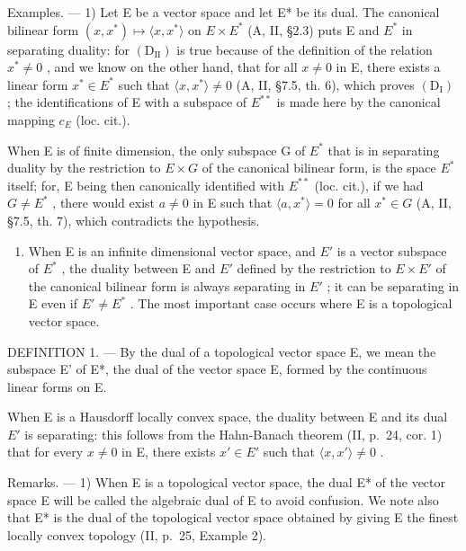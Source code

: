 Examples. --- 1) Let E be a vector space and let E* be its dual. The canonical bilinear form \((x, x^{*}) \mapsto \langle x, x^{*} \rangle\) on \(E \times E^{*}\) (A, II, §2.3) puts E and \(E^{*}\) in separating duality: for \((\mathrm{D}_{\mathrm{II}})\) is true because of the definition of the relation \(x^{*} \neq 0\) , and we know on the other hand, that for all \(x \neq 0\) in E, there exists a linear form \(x^{*} \in E^{*}\) such that \(\langle x, x^{*} \rangle \neq 0\) (A, II, §7.5, th. 6), which proves \((\mathrm{D}_{\mathrm{I}})\) ; the identifications of E with a subspace of \(E^{**}\) is made here by the canonical mapping \(c_{E}\) (loc. cit.).

When E is of finite dimension, the only subspace G of \(E^{*}\) that is in separating duality by the restriction to \(E \times G\) of the canonical bilinear form, is the space \(E^{*}\) itself; for, E being then canonically identified with \(E^{**}\) (loc. cit.), if we had \(G \neq E^{*}\) , there would exist \(a \neq 0\) in E such that \(\langle a, x^{*} \rangle = 0\) for all \(x^{*} \in G\) (A, II, §7.5, th. 7), which contradicts the hypothesis.

\begin{enumerate}
\def\labelenumi{\arabic{enumi})}
\setcounter{enumi}{1}
\tightlist
\item
  When E is an infinite dimensional vector space, and \(E'\) is a vector subspace of \(E^{*}\) , the duality between E and \(E'\) defined by the restriction to \(E \times E'\) of the canonical bilinear form is always separating in \(E'\) ; it can be separating in E even if \(E' \neq E^{*}\) . The most important case occurs where E is a topological vector space.
\end{enumerate}

DEFINITION 1. --- By the dual of a topological vector space E, we mean the subspace E' of E*, the dual of the vector space E, formed by the continuous linear forms on E.

When E is a Hausdorff locally convex space, the duality between E and its dual \(E'\) is separating: this follows from the Hahn-Banach theorem (II, p.~24, cor. 1) that for every \(x \neq 0\) in E, there exists \(x' \in E'\) such that \(\langle x, x' \rangle \neq 0\) .

Remarks. --- 1) When E is a topological vector space, the dual E* of the vector space E will be called the algebraic dual of E to avoid confusion. We note also that E* is the dual of the topological vector space obtained by giving E the finest locally convex topology (II, p.~25, Example 2).

